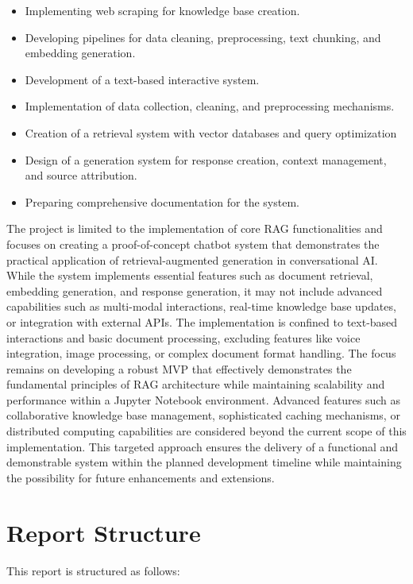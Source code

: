 \documentclass[12pt,a4paper]{report}
\begin{document}
\begin{itemize}
    \item Implementing web scraping for knowledge base creation.
    \item Developing pipelines for data cleaning, preprocessing, text chunking, and embedding generation.
    \item Development of a text-based interactive system.
    \item Implementation of data collection, cleaning, and preprocessing mechanisms.
    \item Creation of a retrieval system with vector databases and query optimization
    \item Design of a generation system for response creation, context management, and source attribution.
    \item Preparing comprehensive documentation for the system.
\end{itemize}

The project is limited to the implementation of core RAG functionalities and focuses on creating a proof-of-concept chatbot system that demonstrates the practical application of retrieval-augmented generation in conversational AI. While the system implements essential features such as document retrieval, embedding generation, and response generation, it may not include advanced capabilities such as multi-modal interactions, real-time knowledge base updates, or integration with external APIs. The implementation is confined to text-based interactions and basic document processing, excluding features like voice integration, image processing, or complex document format handling. The focus remains on developing a robust MVP that effectively demonstrates the fundamental principles of RAG architecture while maintaining scalability and performance within a Jupyter Notebook environment. Advanced features such as collaborative knowledge base management, sophisticated caching mechanisms, or distributed computing capabilities are considered beyond the current scope of this implementation. This targeted approach ensures the delivery of a functional and demonstrable system within the planned development timeline while maintaining the possibility for future enhancements and extensions.

\section{Report Structure}

This report is structured as follows:
\end{document}
